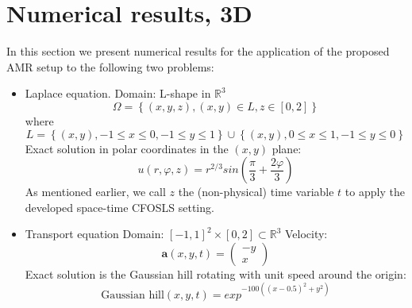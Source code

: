 \documentclass[a4paper,12pt]{amsart}
\numberwithin{equation}{section}
\def\bu{{\mathbf a}} %
\begin{document}
%
%

\section{Numerical results, 3D}

In this section we present numerical results for the application of the proposed AMR setup to the following two problems:

\begin{itemize}
	\item Laplace equation. \newline
	Domain: L-shape in $\mathbb{R}^3$
	$$
	\Omega = \left\{ (x,y,z), (x,y) \in L, z\in [0,2] \right\}
	$$
	where
	$$
	L = \left\{ (x,y), -1 \leq x \leq 0, -1 \leq y \leq 1 \right\} \cup
	\left\{ (x,y), 0 \leq x \leq 1, -1 \leq y \leq 0 \right\}
	$$
	Exact solution in polar coordinates in the $(x,y)$ plane:
	$$
	u(r,\varphi,z) = r^{2/3} sin ( \frac{\pi}{3} + \frac{2\varphi}{3} )
	$$
	As mentioned earlier, we call $z$ the (non-physical) time variable $t$ to apply the developed space-time CFOSLS setting.
	\item Transport equation \newline
	Domain: $[-1,1]^2 \times [0,2] \subset \mathbb{R}^3$ \newline
	Velocity: 
	$$
	\bu(x,y,t) = 
	\left(
	\begin{array}{c}
	-y \\
    x
	\end{array}
	\right)
	$$
	Exact solution is the Gaussian hill rotating with unit speed around the origin:
	$$
	\mbox{Gaussian hill}(x,y,t) = exp^{-100 \left( (x-0.5)^2 + y^2 \right) }
	$$
\end{itemize}
\end{document}
